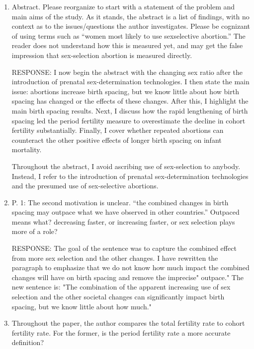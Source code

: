 \documentclass[letterpaper,12pt]{article}
\begin{document}
\begin{enumerate}[resume]

\item  Abstract. Please reorganize to start with a statement of the problem and main aims of
the study. As it stands, the abstract is a list of findings, with no context as to the
issues/questions the author investigates. Please be cognizant of using terms such as “women
most likely to use sexselective abortion.” The reader does not understand how this is
measured yet, and may get the false impression that sex-selection abortion is measured
directly.

RESPONSE: I now begin the abstract with the changing sex ratio after the introduction of
prenatal sex-determination technologies. I then state the main issue: abortions increase
birth spacing, but we know little about how birth spacing has changed or the effects of
these changes. After this, I highlight the main birth spacing results. Next, I discuss how
the rapid lengthening of birth spacing led the period fertility measure to overestimate the
decline in cohort fertility substantially. Finally, I cover whether repeated abortions can
counteract the other positive effects of longer birth spacing on infant mortality. 

Throughout the abstract, I avoid ascribing use of sex-selection to anybody.
Instead, I refer to the introduction of prenatal sex-determination technologies and the 
presumed use of sex-selective abortions.

\item  P. 1: The second motivation is unclear. ``the combined changes in birth spacing may
outpace what we have observed in other countries.'' Outpaced means what? decreasing faster,
or increasing faster, or sex selection plays more of a role?

RESPONSE: The goal of the sentence was to capture the combined effect from more sex
selection and the other changes.
I have rewritten the paragraph to emphasize that we do not know how much impact
the combined changes will have on birth spacing and remove the imprecise" outpace." The new
sentence is: "The combination of the apparent increasing use of sex selection and the other
societal changes can significantly impact birth spacing, but we know little about how
much."


\item  Throughout the paper, the author compares the total fertility rate to cohort fertility
rate. For the former, is the period fertility rate a more accurate definition?


\end{enumerate}
\end{document}
